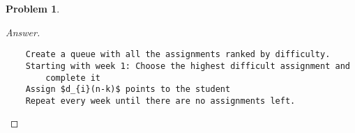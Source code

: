 \documentclass[11pt]{article}
\theoremstyle{definition}
\theoremstyle{definition}
\newtheorem{required}{Problem}
\theoremstyle{definition}
\begin{document}
\begin{required}
\begin{enumerate}[label=(\alph*)]
\begin{proof}[Answer] $ $ \\
\begin{lstlisting}
    Create a queue with all the assignments ranked by difficulty. 
    Starting with week 1: Choose the highest difficult assignment and
        complete it 
    Assign $d_{i}(n-k)$ points to the student
    Repeat every week until there are no assignments left. 
\end{lstlisting}
\end{proof}

\end{enumerate}
\end{required}




\end{document}
